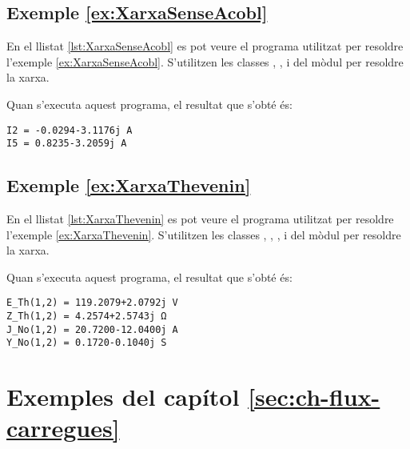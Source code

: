 \hypertarget{exemple:XarxaSenseAcobl}{\subsection{Exemple \ref*{ex:XarxaSenseAcobl} \XarxaSenseAcobl}}
En el llistat \vref{lst:XarxaSenseAcobl} es pot veure el programa utilitzat per resoldre l'exemple \vref{ex:XarxaSenseAcobl}. S'utilitzen les classes ,  ,  i  del mòdul  per resoldre la xarxa.


Quan s'executa aquest programa, el resultat que s'obté és:
\lstset{
	language=,
	numbers=none,
	frame=none
}
\begin{lstlisting}
I2 = -0.0294-3.1176j A
I5 = 0.8235-3.2059j A
\end{lstlisting} 

\hypertarget{exemple:XarxaThevenin}{\subsection{Exemple \ref*{ex:XarxaThevenin} \XarxaThevenin}}
En el llistat \vref{lst:XarxaThevenin} es pot veure el programa utilitzat per resoldre l'exemple \vref{ex:XarxaThevenin}. S'utilitzen les classes , , ,  i  del mòdul  per resoldre la xarxa.


Quan s'executa aquest programa, el resultat que s'obté és:
\lstset{
	language=,
	numbers=none,
	frame=none
}
\begin{lstlisting}
E_Th(1,2) = 119.2079+2.0792j V
Z_Th(1,2) = 4.2574+2.5743j Ω
J_No(1,2) = 20.7200-12.0400j A
Y_No(1,2) = 0.1720-0.1040j S
\end{lstlisting} 



\section{Exemples del capítol \ref*{sec:ch-flux-carregues}}

